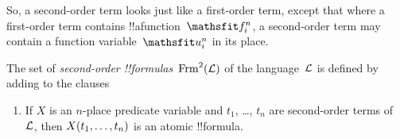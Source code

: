 \documentclass[../../../include/open-logic-section]{subfiles}
\begin{document}
\begin{explain}
So, a second-order term looks just like a first-order term, except
that where a first-order term contains !!a{function}~$\Obj{f^n_i}$, a
second-order term may contain a function variable~$\Obj{u^n_i}$ in its
place.
\end{explain}

\begin{defn}
The set of \emph{second-order !!{formula}s}~$\FrmSOL[L]$ of the
language~$\Lang L$ is defined by adding to
 the clauses
\begin{enumerate}
\item If $X$ is an $n$-place predicate variable and $t_1$, \dots,
  $t_n$ are second-order terms of~$\Lang L$, then
  $\mathord{X}(t_1,\ldots, t_n)$ is an atomic !!{formula}.




\end{enumerate}
\end{defn}
\end{document}
